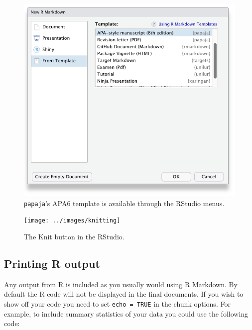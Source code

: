 \documentclass[
  man,floatsintext]{apa6}
\begin{document}
\begin{figure}

{\centering \includegraphics[width=5.19in]{../images/template_selection} 

}

\caption{\texttt{papaja}'s APA6 template is available through the RStudio menus.}\label{fig:menu}
\end{figure}



\begin{figure}

{\centering \texttt{[image: ../images/knitting]} 

}

\caption{The Knit button in the RStudio.}\label{fig:knit}
\end{figure}

\hypertarget{printing-r-output}{%
\subsection{Printing R output}\label{printing-r-output}}

Any output from R is included as you usually would using R Markdown.
By default the R code will not be displayed in the final documents.
If you wish to show off your code you need to set \texttt{echo\ =\ TRUE} in the chunk options.
For example, to include summary statistics of your data you could use the following code:
\end{document}
